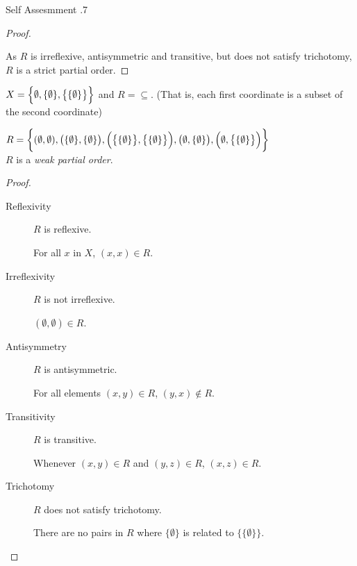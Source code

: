 \documentclass[\main/notes.tex]{subfiles}
\begin{document}
\begin{exercise}{Self Assesmment \thechapter.7}
\begin{questions}
\begin{questions}
\begin{answer}
\begin{proof}
\begin{description}
											\end{description}
											As $R$ is irreflexive, antisymmetric and transitive, but does not satisfy trichotomy, $R$ is a strict partial order.
										\end{proof}
									\end{answer}
								\tcbbreak
								\item $X = \Bigl\{\emptyset, \{\emptyset\}, \bigl\{\{\emptyset\}\bigr\}\Bigr\}$ and $R = \subseteq$. (That is, each first coordinate is a subset of the second coordinate)\\
									\begin{answer}
										$R = \biggl\{(\emptyset, \emptyset), \bigl(\{\emptyset\}, \{\emptyset\}\bigr), \Bigl(\bigl\{\{\emptyset \}\bigr\}, \bigl\{\{\emptyset\}\bigr\}\Bigr), \bigl(\emptyset, \{\emptyset\}\bigr), \Bigl(\emptyset, \bigl\{\{\emptyset\}\bigr\}\Bigr)\biggr\}$\\
										$R$ is a \emph{weak partial order}.
										\begin{proof}
											$ $
											\begin{description}
												\item[Reflexivity] $R$ is reflexive.
													\begin{subproof}
														For all $x$ in $X$, $(x, x) \in R$.
													\end{subproof}
												\item[Irreflexivity] $R$ is not irreflexive.
													\begin{subproof}[Counterexample]
														$(\emptyset, \emptyset) \in R$.
													\end{subproof}
												\item[Antisymmetry] $R$ is antisymmetric.
													\begin{subproof}
														For all elements $(x, y) \in R$, $(y, x) \notin R$.
													\end{subproof}
												\item[Transitivity] $R$ is transitive.
													\begin{subproof}
														Whenever $(x, y) \in R$ and $(y, z) \in R$, $(x, z) \in R$.
													\end{subproof}
												\item[Trichotomy] $R$ does not satisfy trichotomy.
													\begin{subproof}[Counterexample]
														There are no pairs in $R$ where $\{\emptyset\}$ is related to $\bigl\{\{\emptyset\}\bigr\}$.

\end{subproof}
\end{description}
\end{proof}
\end{answer}
\end{questions}
\end{questions}
\end{exercise}
\end{document}
